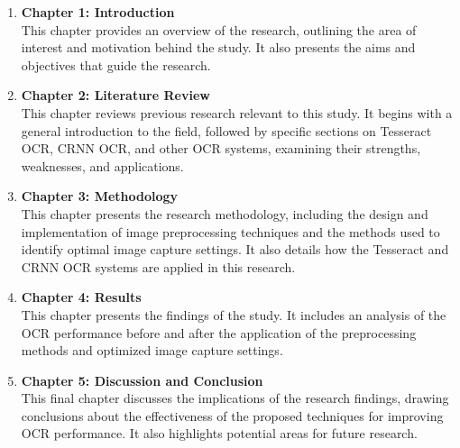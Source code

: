 \begin{enumerate}
    \item \textbf{Chapter 1: Introduction}\\
          This chapter provides an overview of the research, outlining the area of interest and motivation behind the study. It also presents the aims and objectives that guide the research.

    \item \textbf{Chapter 2: Literature Review}\\
          This chapter reviews previous research relevant to this study. It begins with a general introduction to the field, followed by specific sections on Tesseract OCR, CRNN OCR, and other OCR systems, examining their strengths, weaknesses, and applications.

    \item \textbf{Chapter 3: Methodology}\\
          This chapter presents the research methodology, including the design and implementation of image preprocessing techniques and the methods used to identify optimal image capture settings. It also details how the Tesseract and CRNN OCR systems are applied in this research.

    \item \textbf{Chapter 4: Results}\\
          This chapter presents the findings of the study. It includes an analysis of the OCR performance before and after the application of the preprocessing methods and optimized image capture settings.

    \item \textbf{Chapter 5: Discussion and Conclusion}\\
          This final chapter discusses the implications of the research findings, drawing conclusions about the effectiveness of the proposed techniques for improving OCR performance. It also highlights potential areas for future research.
\end{enumerate}


